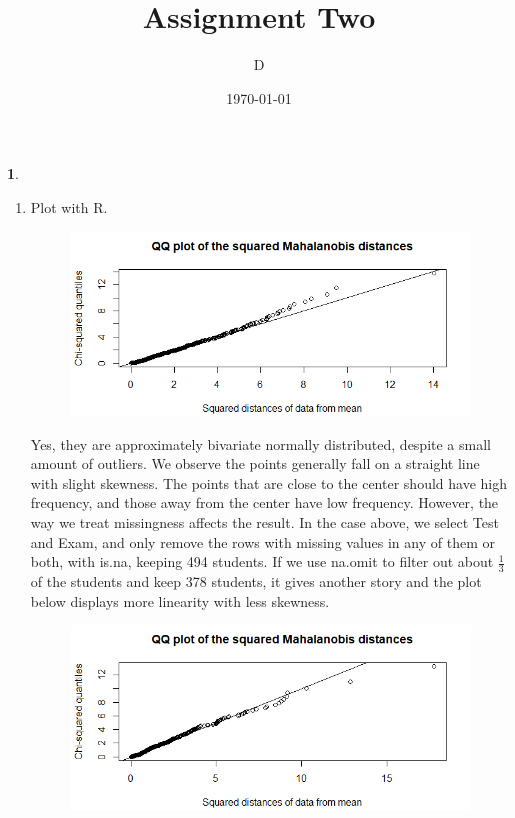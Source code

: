 \documentclass[10pt]{article}
\author{D}
\newtheorem{prob}{\bm{$Problem$}}
\begin{document}
\title{Assignment Two}
\date{\today}
\maketitle
\thispagestyle{fancy}

\newpage

\begin{prob}
\end{prob}
\begin{enumerate}[1)]
\vspace{3mm}

\item
Plot with R.
\begin{figure}[H]
  \centering
  \includegraphics[scale=0.45]{p11b.png}
\end{figure}
Yes, they are approximately bivariate normally distributed, despite a small amount of outliers. We observe the points generally fall on a straight line with slight skewness. The points that are close to the center should have high frequency, and those away from the center have low frequency. However, the way we treat missingness affects the result. In the case above, we select {\ttfamily Test} and {\ttfamily Exam}, and only remove the rows with missing values in any of them or both, with {\ttfamily is.na}, keeping 494 students. If we use {\ttfamily na.omit} to filter out about $\frac{1}{3}$ of the students and keep 378 students, it gives another story and the plot below displays more linearity with less skewness.
\begin{figure}[H]
  \centering
  \includegraphics[scale=0.45]{p11c.png}
\end{figure}


\end{enumerate}
\end{document}
